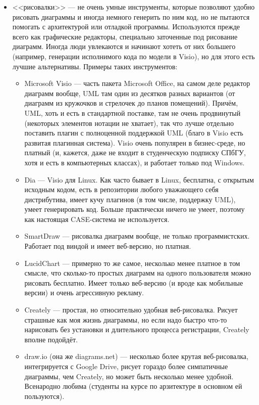 \documentclass[a5paper]{article}
\begin{document}
\begin{itemize}
    \item <<рисовалки>> --- не очень умные инструменты, которые позволяют удобно рисовать диаграммы и иногда немного генерить по ним код, но не пытаются помогать с архитектурой или отладкой программы. Используются прежде всего как графические редакторы, специально заточенные под рисование диаграмм. Иногда люди увлекаются и начинают хотеть от них большего (например, генерации исполнимого кода по модели в Visio), но для этого есть лучшие альтернативы. Примеры таких инструментов:
    \begin{itemize}
        \item Microsoft Visio --- часть пакета Microsoft Office, на самом деле редактор диаграмм вообще, UML там один из десятков разных вариантов (от диаграмм из кружочков и стрелочек до планов помещений). Причём, UML, хоть и есть в стандартной поставке, там не очень продвинутый (некоторых элементов нотации не хватает), так что лучше отдельно поставить плагин с полноценной поддержкой UML (благо в Visio есть развитая плагинная система). Visio очень популярен в бизнес-среде, но платный (и, кажется, даже не входит в студенческую подписку СПбГУ, хотя и есть в компьютерных классах), и работает только под Windows.
        \item Dia --- Visio для Linux. Как часто бывает в Linux, бесплатна, с открытым исходным кодом, есть в репозитории любого уважающего себя дистрибутива, имеет кучу плагинов (в том числе, поддержку UML), умеет генерировать код. Больше практически ничего не умеет, поэтому как настоящая CASE-система не используется.
        \item SmartDraw --- рисовалка диаграмм вообще, не только программистских. Работает под виндой и имеет веб-версию, но платная.
        \item LucidChart --- примерно то же самое, несколько менее платное в том смысле, что сколько-то простых диаграмм на одного пользователя можно рисовать бесплатно. Имеет только веб-версию (и вроде как мобильные версии) и очень агрессивную рекламу.
        \item Creately --- простая, но относительно удобная веб-рисовалка. Рисует страшные как моя жизнь диаграммы, но если надо быстро что-то нарисовать без установки и длительного процесса регистрации, Creately вполне подойдёт.
        \item draw.io (она же diagrams.net) --- несколько более крутая веб-рисовалка, интегрируется с Google Drive, рисует гораздо более симпатичные диаграммы, чем Creately, но может быть несколько менее удобной. Всенародно любима (студенты на курсе по арзитектуре в основном ей пользуются).

\end{itemize}
\end{itemize}
\end{document}
